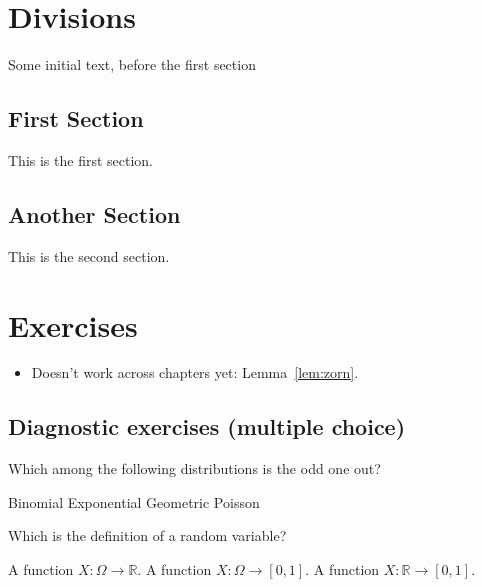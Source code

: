 \documentclass{camel}
\def\it{\item}
\def\bit{\begin{itemize}}
\def\eit{\end{itemize}}
\newcommand{\R}{\mathbb{R}}
\begin{document}
\makefrontmatter


\chapter{Divisions}\label{ch:divisions}

Some initial text, before the first section
\section{First Section}
This is the first section.

\section{Another Section}
This is the second section.



\chapter{Exercises}\label{ch:exercises}

\bit
\it Doesn't work across chapters yet: Lemma~\ref{lem:zorn}.
\eit
\section{Diagnostic exercises (multiple choice)}
\begin{diagnostic}\label{dex:demo}
\begin{questions}
\question Which among the following distributions is the odd one out? \label{qu:dex:demo:first-question}
\begin{choices}
\choice Binomial
\correctchoice Exponential
\choice Geometric
\choice Poisson
\end{choices}
\question Which is the definition of a random variable? \label{qu:dex:demo:second-question}
\begin{choices}
\correctchoice A function $X:\Omega\to\R$.
\choice A function $X:\Omega\to[0,1]$.
\choice A function $X:\R\to[0,1]$.
\end{choices}
\end{questions}
\end{diagnostic}
\end{document}
